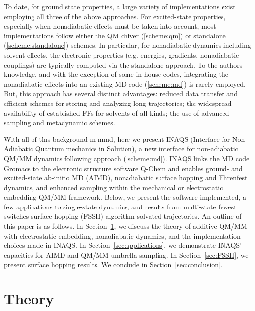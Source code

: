 \documentclass[journal=jctcce,manuscript=article,layout=traditional]{achemso}
\begin{document}
%
%
%


%
%
%
%
%
%
%
%
%
%
%
%
%
%
%
%
%
%
%
%


To date, for ground state properties, a large variety of implementations exist employing all three of the above approaches.
For excited-state properties, especially when nonadiabatic effects must be taken into account, most implementations follow either the QM driver (\ref{scheme:qm}) or standalone (\ref{scheme:standalone}) schemes.
In particular, for nonadiabatic dynamics including solvent effects, the electronic properties (e.g. energies, gradients, nonadiabatic couplings) are typically computed via the standalone approach\cite{NewtonxQMMM,Mai2018,Thiel2014,Granucci2007,Thiel2011,Davide2021,Menger2018,Persico2014}. 
To the authors knowledge, and with the exception of some in-house codes\cite{groenhof2004:excitedQMMM,morozov2016photobiology}, integrating the nonadiabatic effects into an existing MD code (\ref{scheme:md}) is  rarely employed.\cite{Ivano2011}
But, this approach has several distinct advantages: reduced data transfer and efficient schemes for storing and analyzing long trajectories; the widespread availability of established FFs for solvents of all kinds; the use of advanced sampling and metadynamic schemes.
%

With all of this background in mind, here we present INAQS (Interface for Non-Adiabatic Quantum mechanics in Solution), a new interface for non-adiabatic QM/MM dynamics following approach (\ref{scheme:md}).
INAQS links the MD code Gromacs to the electronic structure software Q-Chem and enables ground- and excited-state ab-initio MD (AIMD), nonadiabatic surface hopping and Ehrenfest dynamics, and enhanced sampling within the mechanical or electrostatic embedding QM/MM framework.
Below, we present the software implemented, a few applications to single-state dynamics, and results from multi-state fewest switches surface hopping (FSSH) algorithm solvated trajectories. An outline of this paper is as follows.
In Section~\ref{sec:theory}, we discuss the theory of additive QM/MM with electrostatic embedding, nonadiabatic dynamics,  and the implementation choices made in INAQS. 
In Section~\ref{sec:applications}, we demonstrate INAQS' capacities for AIMD and QM/MM umbrella sampling. 
In Section~\ref{sec:FSSH}, we present surface hopping
%
results.
We conclude in Section~\ref{sec:conclusion}.

\section{Theory}\label{sec:theory}
\end{document}

